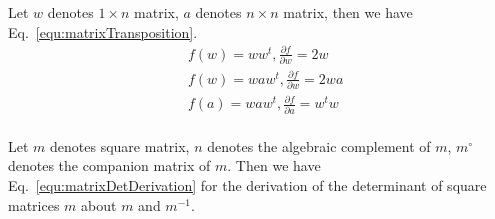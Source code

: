 \documentclass[runningheads,openany]{xhlPaper}
\begin{document}
Let $w$ denotes $1 \times n$ matrix, $a$ denotes $n \times n$ matrix, then we have Eq.~\ref{equ:matrixTransposition}.
\begin{equation}
\label{equ:matrixTransposition}
\begin{aligned}
&f(w) = w{w^t},\frac{{\partial f}}{{\partial w}} = 2w\\
&f(w) = wa{w^t},\frac{{\partial f}}{{\partial w}} = 2wa\\
&f(a) = wa{w^t}, \frac{{\partial f}}{{\partial a}} = w^tw\\
\end{aligned}
\end{equation}

Let $m$ denotes square matrix, $n$ denotes the algebraic complement of $m$, $m^{\circ}$ denotes the companion matrix of $m$. Then we have Eq.~\ref{equ:matrixDetDerivation} for the derivation of the determinant of square matrices $m$ about $m$ and $m^{-1}$.
\end{document}
